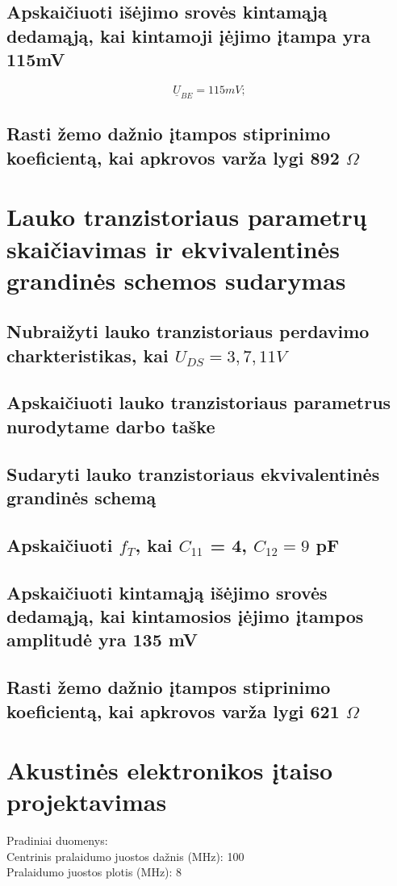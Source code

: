 \documentclass[11pt,a4paper]{article}
\begin{document}
\subsection{Apskaičiuoti išėjimo srovės kintamąją dedamąją, kai kintamoji įėjimo įtampa yra 115mV}

\[
\underline{U}_{BE} = 115mV;
\]

\subsection{Rasti žemo dažnio įtampos stiprinimo koeficientą, kai apkrovos varža lygi 892 $\Omega$ }

\section{Lauko tranzistoriaus parametrų skaičiavimas ir ekvivalentinės grandinės schemos sudarymas}
\subsection{Nubraižyti lauko tranzistoriaus perdavimo charkteristikas, kai $U_{DS} = 3,7,11 V$}
\subsection{Apskaičiuoti lauko tranzistoriaus parametrus nurodytame darbo taške}
\subsection{Sudaryti lauko tranzistoriaus ekvivalentinės grandinės schemą}
\subsection{Apskaičiuoti $f_{T}$, kai $C_{11}$ = 4, $C_{12} = 9$ pF}
\subsection{Apskaičiuoti kintamąją išėjimo srovės dedamąją, kai kintamosios įėjimo įtampos amplitudė yra 135 mV}
\subsection{Rasti žemo dažnio įtampos stiprinimo koeficientą, kai apkrovos varža lygi 621 $\Omega$}

\section{Akustinės elektronikos įtaiso projektavimas}
Pradiniai duomenys:\\
Centrinis pralaidumo juostos dažnis (MHz): 100\\
Pralaidumo juostos plotis (MHz): 8
\end{document}
